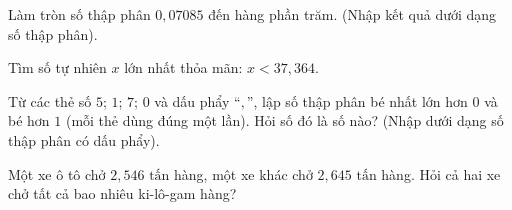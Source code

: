 \begin{ex} %
Làm tròn số thập phân $0{,}07085$ đến hàng phần trăm. (Nhập kết quả dưới dạng số thập phân).
\end{ex}

\begin{ex} %
Tìm số tự nhiên $x$ lớn nhất thỏa mãn: $x < 37{,}364$.
\end{ex}

\begin{ex} %
Từ các thẻ số $5$; $1$; $7$; $0$ và dấu phẩy ``$,$'', lập số thập phân bé nhất lớn hơn $0$ và bé hơn $1$ (mỗi thẻ dùng đúng một lần). Hỏi số đó là số nào? (Nhập dưới dạng số thập phân có dấu phẩy).
\end{ex}

\begin{ex} %
Một xe ô tô chở $2{,}546\text{ tấn}$ hàng, một xe khác chở $2{,}645\text{ tấn}$ hàng. Hỏi cả hai xe chở tất cả bao nhiêu ki-lô-gam hàng?
\end{ex}
